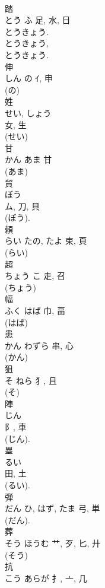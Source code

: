 \documentclass[8pt]{extreport}
\begin{document}
\begin{CJK}{UTF8}{min}
\\	踏	
\\	とう	ふ	足, 水, 日	
\\	とうきょう. 
\\	とうきょう, 
\\	とうきょう. 
\\	伸	
\\	しん	の	ｲ, 申	
\\	(の) 
\\	姓	
\\	せい, しょう	
\\	女, 生	
\\	(せい) 
\\	甘	
\\	かん	あま	甘	
\\	(あま) 
\\	貿	
\\	ぼう	
\\	ム, 刀, 貝	
\\	(ぼう). 
\\	頼	
\\	らい	たの, たよ	束, 頁	
\\	(らい) 
\\	超	
\\	ちょう	こ	走, 召	
\\	(ちょう) 
\\	幅	
\\	ふく	はば	巾, 畐	
\\	(はば) 
\\	患	
\\	かん	わずら	串, 心	
\\	(かん) 
\\	狙	
\\	そ	ねら	犭, 且	
\\	(そ) 
\\	陣	
\\	じん	
\\	阝, 車	
\\	(じん). 
\\	塁	
\\	るい	
\\	田, 土		
\\	(るい). 
\\	弾	
\\	だん	ひ, はず, たま	弓, 単	
\\	(だん). 
\\	葬	
\\	そう	ほうむ	艹, 歹, 匕, 廾	
\\	(そう) 
\\	抗	
\\	こう	あらが	扌, 亠, 几	

\end{CJK}
\end{document}
